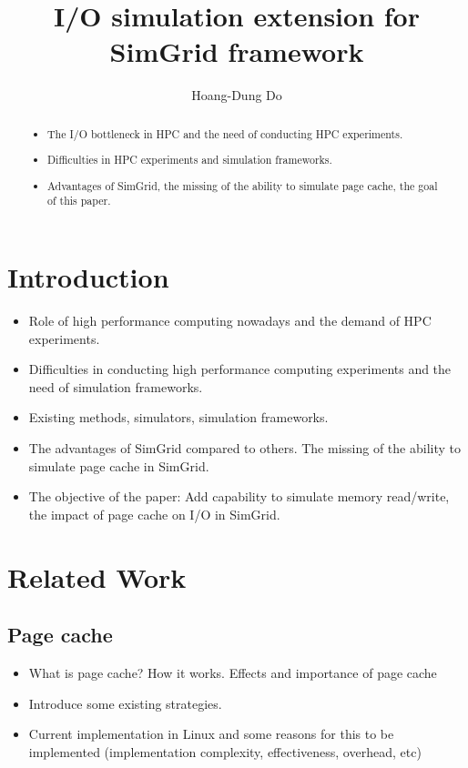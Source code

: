 \documentclass[conference]{IEEEtran}
\begin{document}
\title{I/O simulation extension for SimGrid framework}
\author{Hoang-Dung Do}
\maketitle

\begin{abstract}
	\begin{itemize}
		\item The I/O bottleneck in HPC and the need of conducting HPC experiments.
		\item Difficulties in HPC experiments and simulation frameworks.
		\item Advantages of SimGrid, the missing of the ability to simulate page cache, the goal of this paper.
	\end{itemize}
\end{abstract}

	\section{Introduction}
		\begin{itemize}
			\item Role of high performance computing nowadays and the demand of HPC experiments.
			\item Difficulties in conducting high performance computing experiments and the need of simulation frameworks.
			\item Existing methods, simulators, simulation frameworks. 
			\item The advantages of SimGrid compared to others. The missing of the ability to simulate page cache in SimGrid.
			\item The objective of the paper: Add capability to simulate memory read/write, the impact of page cache on I/O in SimGrid.
		\end{itemize}
	\section{Related Work}			
		
		\subsection{Page cache}
			\begin{itemize}
				\item What is page cache? How it works. Effects and importance of page cache
				\item Introduce some existing strategies.
				\item Current implementation in Linux and some reasons for this to be implemented (implementation complexity, effectiveness, overhead, etc)
			\end{itemize}									
\end{document}
